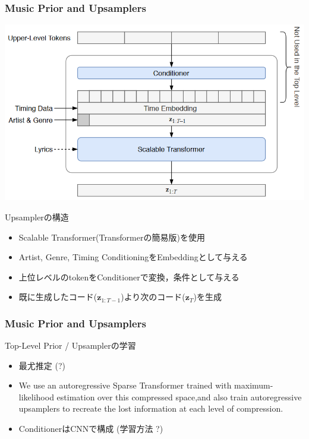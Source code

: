 \documentclass[dvipdfmx]{beamer}
\begin{document}
\begin{frame}
    \frametitle{Music Prior and Upsamplers}
    \begin{center}
        \includegraphics[scale=0.25]{figure/priormodeldetail.png}
    \end{center}
    Upsamplerの構造
    \begin{itemize}
        \item Scalable Transformer(Transformerの簡易版)を使用
        \item Artist, Genre, Timing ConditioningをEmbeddingとして与える
        \item 上位レベルのtokenをConditionerで変換，条件として与える
        \item 既に生成したコード($\bm{z}_{1:T-1}$)より次のコード($\bm{z}_{T}$)を生成
    \end{itemize}
\end{frame}


\begin{frame}
    \frametitle{Music Prior and Upsamplers}
    Top-Level Prior / Upsamplerの学習
    \begin{itemize}
        \item 最尤推定 {\scriptsize (?)}
        \item {\small We use an autoregressive Sparse Transformer trained with maximum-likelihood estimation over this compressed space,and also train autoregressive upsamplers to recreate the lost information at each level of compression.}
        \vspace{\baselineskip}

        \item ConditionerはCNNで構成 {\small (学習方法 ?)}
    \end{itemize}
    \vspace{\baselineskip}

\end{frame}
\end{document}
